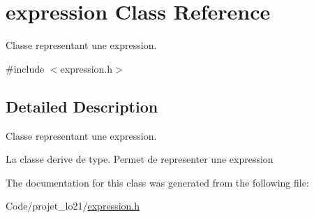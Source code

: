 \hypertarget{classexpression}{\section{expression Class Reference}
\label{classexpression}
}


Classe representant une expression.  




{\ttfamily \#include $<$expression.\-h$>$}



\subsection{Detailed Description}
Classe representant une expression. 

La classe derive de type. Permet de representer une expression 

The documentation for this class was generated from the following file\-:\begin{DoxyCompactItemize}
\item 
Code/projet\-\_\-lo21/\hyperlink{expression_8h}{expression.\-h}\end{DoxyCompactItemize}

